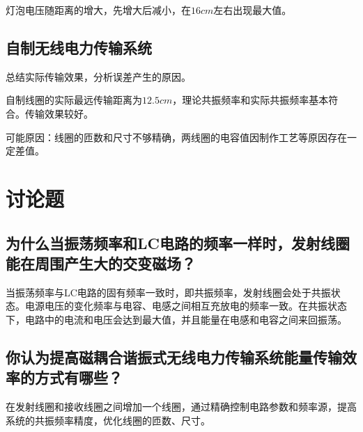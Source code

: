 \documentclass[signature=data]{physicsreport}
\begin{document}
灯泡电压随距离的增大，先增大后减小，在$16cm$左右出现最大值。

\vspace{1em}

\subsection{自制无线电力传输系统}
总结实际传输效果，分析误差产生的原因。

自制线圈的实际最远传输距离为$12.5cm$，理论共振频率和实际共振频率基本符合。传输效果较好。

可能原因：线圈的匝数和尺寸不够精确，两线圈的电容值因制作工艺等原因存在一定差值。
\newpage

\section{讨论题}
\subsection{为什么当振荡频率和LC电路的频率一样时，发射线圈能在周围产生大的交变磁场？}
当振荡频率与LC电路的固有频率一致时，即共振频率，发射线圈会处于共振状态。电源电压的变化频率与电容、电感之间相互充放电的频率一致。在共振状态下，电路中的电流和电压会达到最大值，并且能量在电感和电容之间来回振荡。
\vspace{2em}
\subsection{你认为提高磁耦合谐振式无线电力传输系统能量传输效率的方式有哪些？}

在发射线圈和接收线圈之间增加一个线圈，通过精确控制电路参数和频率源，提高系统的共振频率精度，优化线圈的匝数、尺寸。
\end{document}
